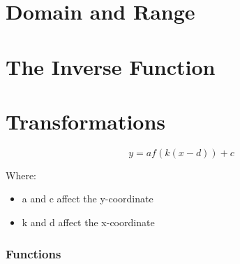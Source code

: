 \documentclass{article}
\begin{document}

\newpage
\section{Domain and Range}


\newpage
\section{The Inverse Function}


\newpage
\section{Transformations}

    \[ y = af(k(x-d))+c \]

    \noindent
    Where:
    \begin{itemize}
        \item a and c affect the y-coordinate
        \item k and d affect the x-coordinate
    \end{itemize}

    \subsubsection*{Functions}
\end{document}
